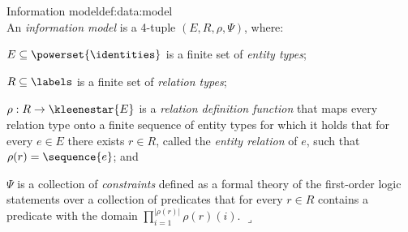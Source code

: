 %
%

\begin{ncdefine}{Information model}{def:data:model}{\quad\\}
An \emph{information model} is a 4-tuple $(E,R,\rho,\Psi)$, where:
\begin{compactitem}
\item
$E \subseteq \powerset{\identities}$ is a finite set of \emph{entity types};
\item
$R \subseteq \labels$ is a finite set of \emph{relation types};
\item
$\rho : R \rightarrow \kleenestar{E}$ is a \emph{relation definition function} that maps every relation type onto a finite sequence of entity types 
for which it holds that for every $e \in E$ there exists $r \in R$, called the \emph{entity relation} of $e$, such that $\rho(r)=\sequence{e}$; and
\item
$\Psi$ is a collection of \emph{constraints} defined as a formal theory of the first-order logic statements over 
a collection of predicates that for every $r \in R$ contains a predicate with the domain $\prod_{i=1}^{|\rho(r)|}{\rho(r)(i)}$. 
\hfill\ensuremath{\lrcorner}
\end{compactitem}	
\end{ncdefine}